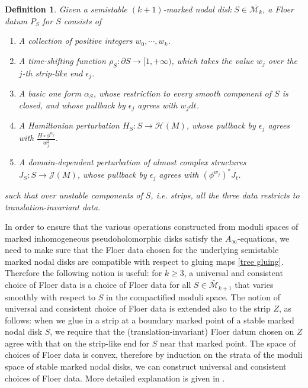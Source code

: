 \documentclass{amsart}
\newtheorem{definition}[theorem]{Definition}
\numberwithin{equation}{section}
\numberwithin{figure}{section}
\begin{document}
\begin{definition}
	Given a semistable $(k+1)$-marked nodal disk $S \in \bar{\mathcal{M}_{k}}$, a Floer datum $P_{S}$ for $S$ consists of
\begin{enumerate}[label=(\roman*)]

\item A collection of positive integers $w_{0}, \cdots, w_{k}$.

\item A time-shifting function $\rho_{S}: \partial S \to [1, +\infty)$, which takes the value $w_{j}$ over the $j$-th strip-like end $\epsilon_{j}$.

\item A basic one form $\alpha_{S}$, whose restriction to every smooth component of $S$ is closed, and whose pullback by $\epsilon_{j}$ agrees with $w_{j}dt$.

\item A Hamiltonian perturbation $H_{S}: S \to \mathcal{H}(M)$, whose pullback by $\epsilon_{j}$ agrees with $\frac{H \circ \phi^{w_{j}}}{w_{j}^{2}}$.

\item A domain-dependent perturbation of almost complex structures $J_{S}: S \to \mathcal{J}(M)$, whose pullback by $\epsilon_{j}$ agrees with $(\phi^{w_{j}})^{*}J_{t}$.

\end{enumerate}
such that over unstable components of $S$, i.e. strips, all the three data restricts to translation-invariant data.
\end{definition}

	In order to ensure that the various operations constructed from moduli spaces of marked inhomogeneous pseudoholomorphic disks satisfy the $A_{\infty}$-equations, we need to make sure that the Floer data chosen for the underlying semistable marked nodal disks are compatible with respect to gluing maps \eqref{tree gluing}. Therefore the following notion is useful: for $k \ge 3$, a universal and consistent choice of Floer data is a choice of Floer data for all $S \in \bar{\mathcal{M}}_{k+1}$ that varies smoothly with respect to $S$ in the compactified moduli space. The notion of universal and consistent choice of Floer data is extended also to the strip $Z$, as follows: when we glue in a strip at a boundary marked point of a stable marked nodal disk $S$, we require that the (translation-invariant) Floer datum chosen on $Z$ agree with that on the strip-like end for $S$ near that marked point. The space of choices of Floer data is convex, therefore by induction on the strata of the moduli space of stable marked nodal disks, we can construct universal and consistent choices of Floer data. More detailed explanation is given in \cite{Seidel}. \par
\end{document}
